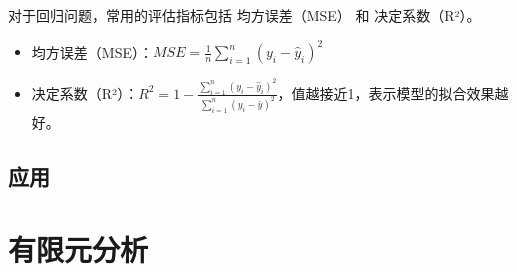 \documentclass[12pt]{article}
\begin{document}
对于回归问题，常用的评估指标包括 均方误差（MSE） 和 决定系数（R²）。
\begin{itemize}
    \item 均方误差（MSE）：$MSE = \frac{1}{n} \sum_{i=1}^{n} (y_i - \hat{y}_i)^2$
    \item 决定系数（R²）：$R^2 = 1 - \frac{\sum_{i=1}^{n} (y_i - \hat{y}_i)^2}{\sum_{i=1}^{n} (y_i - \bar{y})^2}$，值越接近1，表示模型的拟合效果越好。
\end{itemize}
\subsection{应用}

\section{有限元分析}
\end{document}
